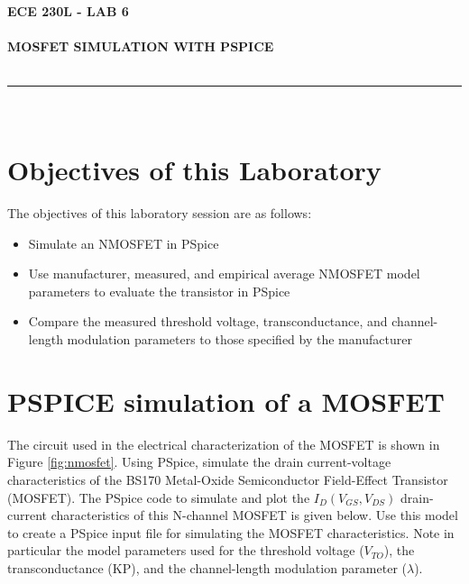 \documentclass[12pt]{../manual}
\begin{document}
\begin{center}
\textbf{\huge ECE 230L - LAB 6}\\~\\
\textbf{\large MOSFET SIMULATION WITH PSPICE}\\~\\
\rule{6.5in}{0.5mm}\\
\end{center}

\tableofcontents

\listoffigures

\newpage
%
\section{Objectives of this Laboratory}
The objectives of this laboratory session are as follows:
\begin{itemize}
\item  Simulate an NMOSFET in PSpice
\item Use manufacturer, measured, and empirical average NMOSFET model parameters to evaluate
the transistor in PSpice
\item Compare the measured threshold voltage, transconductance, and channel-length modulation
parameters to those specified by the manufacturer
\end{itemize}

\section{PSPICE simulation of a MOSFET}
The circuit used in the electrical characterization of the MOSFET is shown in Figure \ref{fig:nmosfet}. Using PSpice, simulate the drain current-voltage characteristics of the BS170 Metal-Oxide Semiconductor Field-Effect Transistor (MOSFET). The PSpice code to simulate and plot the $I_D (V_{GS}, V_{DS})$ drain-current characteristics of this N-channel MOSFET is given below. Use this model to create a PSpice input file for simulating the MOSFET characteristics. Note in particular the model parameters used for the threshold voltage ($V_{TO}$), the transconductance (KP), and the channel-length modulation parameter ($\lambda$).

\end{document}
